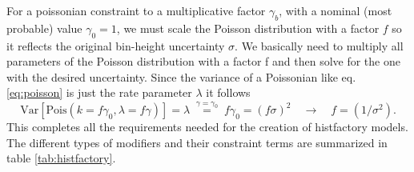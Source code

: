 For a poissonian constraint to a multiplicative factor $\gamma_b$, with a nominal (most probable) value $\gamma_0=1$, we must scale the Poisson distribution with a factor $f$ so it reflects the original bin-height uncertainty $\sigma$. We basically need to multiply all parameters of the Poisson distribution with a factor f and then solve for the one with the desired uncertainty. Since the variance of a Poissonian like eq. \ref{eq:poisson} is just the rate parameter $\lambda$ it follows
\begin{equation}
    \mathrm{Var}\left[\mathrm{Pois}(k=f\gamma_0,\lambda=f\gamma)\right]=\lambda\;\stackrel{\gamma=\gamma_0}{=}\;f\gamma_0=(f\sigma)^2  \quad \rightarrow \quad f=(1/\sigma^2).
\end{equation}
This completes all the requirements needed for the creation of histfactory models. The different types of modifiers and their constraint terms are summarized in table \ref{tab:histfactory}.
